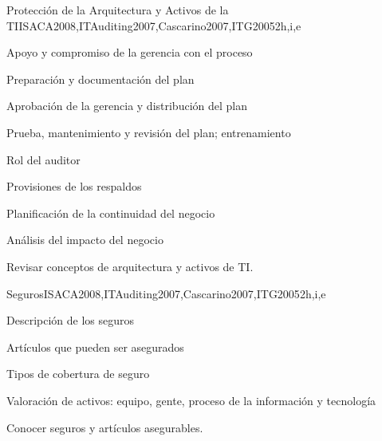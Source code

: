 \begin{syllabus}
    \begin{unit}{Protección de la Arquitectura y Activos de la TI}{}{ISACA2008,ITAuditing2007,Cascarino2007,ITG2005}{2}{h,i,e}
    \begin{topics}
    \item Apoyo y compromiso de la gerencia con el proceso
    \item Preparación y documentación del plan
    \item Aprobación de la gerencia y distribución del plan
    \item Prueba, mantenimiento y revisión del plan; entrenamiento
    \item Rol del auditor
    \item Provisiones de los respaldos
    \item Planificación de la continuidad del negocio
    \item Análisis del impacto del negocio
    \end{topics}
    \begin{learningoutcomes}
    \item Revisar conceptos de arquitectura y activos de TI.
    \end{learningoutcomes}
    \end{unit}
    
    \begin{unit}{Seguros}{}{ISACA2008,ITAuditing2007,Cascarino2007,ITG2005}{2}{h,i,e}
    \begin{topics}
    \item Descripción de los seguros
    \item Artículos que pueden ser asegurados
    \item Tipos de cobertura de seguro
    \item Valoración de activos: equipo, gente, proceso de la información y tecnología
    \end{topics}
    \begin{learningoutcomes}
    \item Conocer seguros y artículos asegurables.
    \end{learningoutcomes}
    \end{unit}
    

\end{syllabus}
